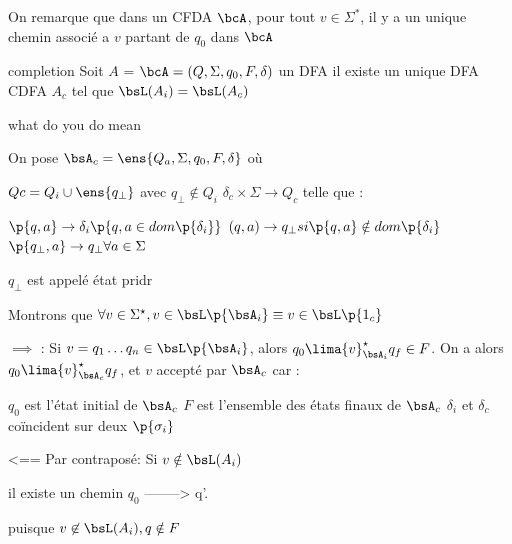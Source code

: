     
    On remarque que dans un CFDA $\bcA$, pour tout $v\in \Sigma^*$, il y a un unique chemin associé a $v$ partant de $q_0$ dans $\bcA$
    
    \begin{theorem}{completion}
        Soit $A$ = $\bcA = (Q,\Sigma, q_0, F, \delta)$ un DFA 
        il existe un unique DFA CDFA $A_c$ tel que $\bsL(A_i) = \bsL(A_c) $
        
        what do you do mean  
             
                
        
    \end{theorem}  
    
    \begin{nproof}
        On pose $\bsA_c = \ens{Q_a, \Sigma, q_0, F, \delta}$ où
        \begin{enumerate}
            \itt $Qc = Q_i \cup \ens{q_\bot}$ avec $q_\bot \notin Q_i$
            \itt $\delta_c \times \Sigma \to Q_c$ telle que :
            \begin{enumerate}
                \itt $\p{q, a} \to \delta_i \p{q, a \in dom \p{\delta_i}}$ %
                \itt $(q, a) \to q_\bot si \p{q, a} \notin dom \p{\delta_i}$
                \itt $\p{q_\bot, a} \to q_\bot \forall a \in \Sigma$
            \end{enumerate}
            
        \end{enumerate}
        $q_\bot$ est appelé état pridr
        
        Montrons que $\forall v \in \Sigma^\star, v \in \bsL \p{\bsA_i} \equiv v \in \bsL \p{1_c}$
        
        $\implies$ : Si $v = q_1 \dots q_n \in \bsL \p{\bsA_i}$, alors $q_0 \lima{v}_{\bsA_i}^\star q_f \in F$. On a alors $q_0 \lima{v}_{\bsA_c}^\star q_f$, et $v$ accepté par $\bsA_c$ car :
        \begin{enumerate}
            \itt $q_0$ est l'état initial de $\bsA_c$
            \itt $F$ est l'ensemble des états finaux de $\bsA_c$
            \itt $\delta_i$ et $\delta_c$ coïncident sur deux $\p{\sigma_i}$
        \end{enumerate}
        
        
        <==
        Par contraposé: Si $v \notin \bsL(A_i) $
        \begin{enumerate}
            \itt il existe un chemin $q_0$ --------> q'. 
        
            puisque $v \not \in \bsL(A_i), q \notin F $
            

\end{enumerate}
\end{nproof}
